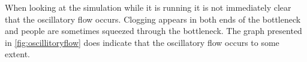 When looking at the simulation while it is running it is not
immediately clear that the oscillatory flow occurs. Clogging
appears in both ends of the bottleneck and people are sometimes
squeezed through the bottleneck. The graph presented in
\ref{fig:oscillitoryflow} does indicate that the oscillatory
flow occurs to some extent.

%
%
%
%
%
%
%
